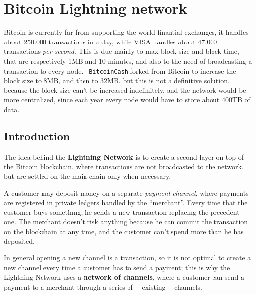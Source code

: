 \chapter{Bitcoin Lightning network}
\label{ch:lightning}
Bitcoin is currently far from supporting the world finantial exchanges, it handles about 250.000 transactions in a day, while VISA handles about 47.000 transactions \textit{per second}.
This is due mainly to max block size and block time, that are respectively 1MB and 10 minutes, and also to the need of broadcasting a transaction to every node.
\texttt{
BitcoinCash} forked from Bitcoin to increase the block size to 8MB, and then to 32MB, but this is not a definitive solution, because the block size can't be increased indefinitely, and the network would be more centralized, since each year every node would have to store about 400TB of data.

\section{Introduction}
The idea behind the \textbf{Lightning Network} is to create a second layer on top of the Bitcoin blockchain, where transactions are not broadcasted to the network, but are settled on the main chain only when necessary.

A customer may deposit money on a separate \textit{payment channel}, where payments are registered in private ledgers handled by the ``merchant''.
Every time that the customer buys something, he sends a new transaction replacing the precedent one.
The merchant doesn't risk anything because he can commit the transaction on the blockchain at any time, and the customer can't spend more than he has deposited.

In general opening a new channel is a transaction, so it is not optimal to create a new channel every time a customer has to send a payment; this is why the Lightning Network uses a \textbf{network of channels}, where a customer can send a payment to a merchant through a series of ---existing--- channels.

